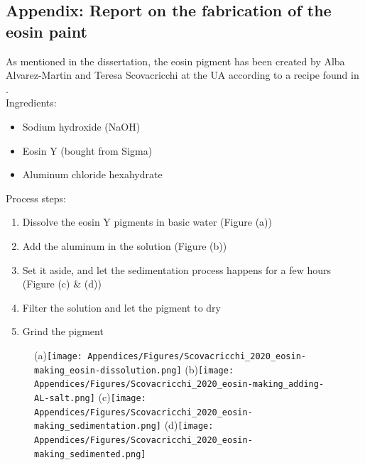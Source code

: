 \begin{appendices}

\newpage
\section[\hspace{0.3cm}Report on the fabrication of the eosin paint]{ Appendix: Report on the fabrication of the eosin paint}
\label{app:ch4_making_eosin}

As mentioned in the dissertation, the eosin pigment has been created by Alba Alvarez-Martin and Teresa Scovacricchi at the \gls{UA} according to a recipe found in \citet{claro_identification_2010}.\\

Ingredients:
\begin{itemize}
\item Sodium hydroxide (NaOH)
\item Eosin Y (bought from Sigma)
\item Aluminum chloride hexahydrate
\end{itemize}

\vspace{1cm}

Process steps:
\begin{enumerate}
\item Dissolve the eosin Y pigments in basic water (Figure (a))
\item Add the aluminum in the solution (Figure (b))
\item Set it aside, and let the sedimentation process happens for a few hours (Figure (c) \& (d))
\item Filter the solution and let the pigment to dry
\item Grind the pigment
\end{enumerate}

\vspace{1.5cm}

\begin{figure}[!h]
  \centering
  
  \subfigure(a){\texttt{[image: Appendices/Figures/Scovacricchi\_2020\_eosin-making\_eosin-dissolution.png]}} 
  \subfigure(b){\texttt{[image: Appendices/Figures/Scovacricchi\_2020\_eosin-making\_adding-AL-salt.png]}} 
  \subfigure(c){\texttt{[image: Appendices/Figures/Scovacricchi\_2020\_eosin-making\_sedimentation.png]}}
  \subfigure(d){\texttt{[image: Appendices/Figures/Scovacricchi\_2020\_eosin-making\_sedimented.png]}}


\end{figure}
\end{appendices}
